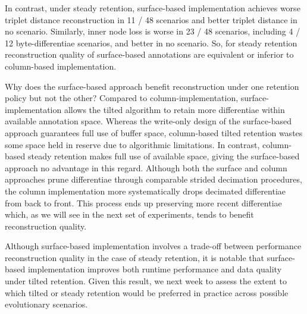 In contrast, under steady retention, surface-based implementation achieves worse triplet distance reconstruction in 11 / 48 scenarios and better triplet distance in no scenario.
Similarly, inner node loss is worse in 23 / 48 scenarios, including 4 / 12 byte-differentiae scenarios, and better in no scenario.
So, for steady retention reconstruction quality of surface-based annotations are equivalent or inferior to column-based implementation.

Why does the surface-based approach benefit reconstruction under one retention policy but not the other?
Compared to column-implementation, surface-implementation allows the tilted algorithm to retain more differentiae within available annotation space.
Whereas the write-only design of the surface-based approach guarantees full use of buffer space, column-based tilted retention wastes some space held in reserve due to algorithmic limitations.
In contrast, column-based steady retention makes full use of available space, giving the surface-based approach no advantage in this regard.
Although both the surface and column approaches prune differentiae through comparable strided decimation procedures, the column implementation more systematically drops decimated differentiae from back to front.
This process ends up preserving more recent differentiae which, as we will see in the next set of experiments, tends to benefit reconstruction quality.

Although surface-based implementation involves a trade-off between performance reconstruction quality in the case of steady retention, it is notable that surface-based implementation improves both runtime performance and data quality under tilted retention.
Given this result, we next week to assess the extent to which tilted or steady retention would be preferred in practice across possible evolutionary scenarios.



